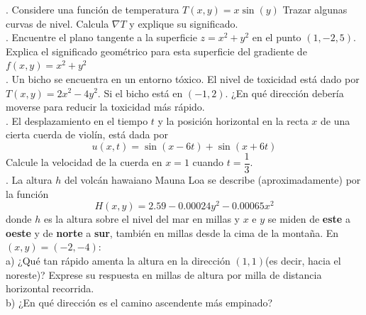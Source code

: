 \documentclass[letterpaper]{article}
\renewcommand{\*}{\cdot}
\theoremstyle{definition}
\begin{document}
. Considere una función de temperatura $ T(x,y) = x\sin(y) $ Trazar algunas curvas de nivel. Calcula $ \nabla T $ y explique su significado.\\

. Encuentre el plano tangente a la superficie $ z = x^2 + y^2 $ en el punto $ (1,-2,5) $. Explica el significado geométrico para esta superficie del gradiente de $ f(x,y)= x^2 + y^2 $\\

. Un bicho se encuentra en un entorno tóxico. El nivel de toxicidad está dado por $ T(x,y) = 2x^2 - 4y^2 $. Si el bicho está en $ (-1,2) $. ¿En qué dirección debería moverse para reducir la toxicidad más rápido.\\

. El desplazamiento en el tiempo $ t $ y la posición horizontal en la recta $ x $ de una cierta cuerda de violín, está dada por $$ u(x,t) = \sin(x - 6t) + \sin(x+6t) $$ Calcule la velocidad de la cuerda en $ x = 1 $ cuando $ t = \dfrac{1}{3} $.\\

. La altura $ h $ del volcán hawaiano Mauna Loa se describe (aproximadamente) por la función $$ H(x,y) = 2.59 - 0.00024y^2 - 0.00065x^2 $$donde $ h $ es la altura sobre el nivel del mar en millas y $ x $ e $ y $ se miden de \textbf{este} a \textbf{oeste} y de \textbf{norte} a \textbf{sur}, también en millas desde la cima de la montaña. En $ (x,y) = (-2,-4) $:\\

a) ¿Qué tan rápido amenta la altura en la dirección $ (1,1) $(es decir, hacia el noreste)? Exprese su respuesta en millas de altura por milla de distancia horizontal recorrida.\\

b) ¿En qué dirección es el camino ascendente más empinado?
\end{document}
